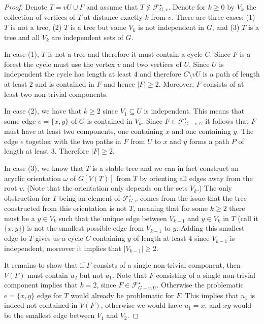\documentclass[a4paper,11pt,reqno]{amsart}
\numberwithin{equation}{section}
\begin{document}
\begin{proof}
Denote $T=vU\cup F$ and assume that $T\notin \mathcal{F}^\star_{G,v}$. 
Denote for $k\geq 0$ by $V_k$ the collection of vertices of $T$ at distance exactly $k$ from $v$. 
There are three cases: (1) $T$ is not a tree, (2) $T$ is a tree but some $V_k$ is not independent in $G$, and (3) $T$ is a tree and all $V_k$ are independent sets of $G$.

In case (1), $T$ is not a tree and therefore it must contain a cycle $C$. Since $F$ is a forest the cycle must use the vertex $v$ and two vertices of $U$. Since $U$ is independent the cycle has length at least $4$ and therefore $C\setminus vU$ is a path of length at least $2$ and is contained in $F$ and hence $|F|\geq 2$. Moreover, $F$ consists of at least two non-trivial components.

In case (2), we have that $k\geq 2$ since $V_1\subseteq U$ is independent.
This means that some edge $e=\{x,y\}$ of $G$ is contained in $V_k$. Since $F\in \mathcal{F}^\star_{G-v,U}$ it follows that $F$ must have at least two components, one containing $x$ and one containing $y$.
The edge $e$ together with the two paths in $F$ from $U$ to $x$ and $y$ forms a path $P$ of length at least $3$. Therefore $|F|\geq 2$.%

In case (3), we know that $T$ is a stable tree and we can in fact construct an acyclic orientation $\omega$ of $G[V(T)]$ from $T$ by orienting all edges away from the root $v$.
(Note that the orientation only depends on the sets $V_k$.)
The only obstruction for $T$ being an element of $\mathcal{F}^\star_{G,v}$ comes from the issue that the tree constructed from this orientation is not $T$, meaning that for some $k\geq 2$ there must be a $y\in V_k$ such that the unique edge between $V_{k-1}$ and $y\in V_k$ in $T$ (call it $\{x,y\} $) is not the smallest possible edge from $V_{k-1}$ to $y$. Adding this smallest edge to $T$ gives us a cycle $C$ containing $y$ of length at least $4$ since $V_{k-1}$ is independent, moreover it implies that $|V_{k-1}|\ge 2$.

It remains to show that if $F$ consists of a single non-trivial component, then $V(F)$ must contain $u_2$ but not $u_1$. Note that $F$ consisting of a single non-trivial component implies that $k=2$, since $F\in \mathcal{F}^\star_{G-v,U}$. Otherwise the problematic $e=\{x,y\}$ edge for $T$ would already be problematic for $F$. 
This implies that $u_1$ is indeed not contained in $V(F)$, otherwise we would have $u_1=x$, and $xy$ would be the smallest edge between $V_1$ and $V_2$.
\end{proof}
\end{document}
